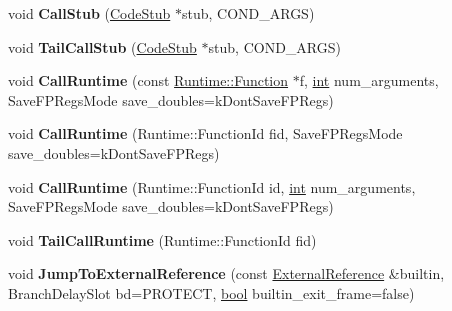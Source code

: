 \begin{DoxyCompactItemize}
\item 
\mbox{\label{classv8_1_1internal_1_1MacroAssembler_a4ec2ca530ed277164bbee74ece8cad73}} 
void {\bfseries Call\+Stub} (\mbox{\hyperlink{classv8_1_1internal_1_1CodeStub}{Code\+Stub}} $\ast$stub, C\+O\+N\+D\+\_\+\+A\+R\+GS)
\item 
\mbox{\label{classv8_1_1internal_1_1MacroAssembler_a5f804b8cbb30ef328ee2de51f3aa818e}} 
void {\bfseries Tail\+Call\+Stub} (\mbox{\hyperlink{classv8_1_1internal_1_1CodeStub}{Code\+Stub}} $\ast$stub, C\+O\+N\+D\+\_\+\+A\+R\+GS)
\item 
\mbox{\label{classv8_1_1internal_1_1MacroAssembler_a37081c297a4c533e549cc58167f7ccaa}} 
void {\bfseries Call\+Runtime} (const \mbox{\hyperlink{structv8_1_1internal_1_1Runtime_1_1Function}{Runtime\+::\+Function}} $\ast$f, \mbox{\hyperlink{classint}{int}} num\+\_\+arguments, Save\+F\+P\+Regs\+Mode save\+\_\+doubles=k\+Dont\+Save\+F\+P\+Regs)
\item 
\mbox{\label{classv8_1_1internal_1_1MacroAssembler_a797b53d578cd762b40c56f4485bf584e}} 
void {\bfseries Call\+Runtime} (Runtime\+::\+Function\+Id fid, Save\+F\+P\+Regs\+Mode save\+\_\+doubles=k\+Dont\+Save\+F\+P\+Regs)
\item 
\mbox{\label{classv8_1_1internal_1_1MacroAssembler_a2db39c653c211a6d21c23b60104e64d5}} 
void {\bfseries Call\+Runtime} (Runtime\+::\+Function\+Id id, \mbox{\hyperlink{classint}{int}} num\+\_\+arguments, Save\+F\+P\+Regs\+Mode save\+\_\+doubles=k\+Dont\+Save\+F\+P\+Regs)
\item 
\mbox{\label{classv8_1_1internal_1_1MacroAssembler_aefb569829758555a7394ce1d34ed2bef}} 
void {\bfseries Tail\+Call\+Runtime} (Runtime\+::\+Function\+Id fid)
\item 
\mbox{\label{classv8_1_1internal_1_1MacroAssembler_ae92373db89a768d12fe7ba88d23282df}} 
void {\bfseries Jump\+To\+External\+Reference} (const \mbox{\hyperlink{classv8_1_1internal_1_1ExternalReference}{External\+Reference}} \&builtin, Branch\+Delay\+Slot bd=P\+R\+O\+T\+E\+CT, \mbox{\hyperlink{classbool}{bool}} builtin\+\_\+exit\+\_\+frame=false)

\end{DoxyCompactItemize}
